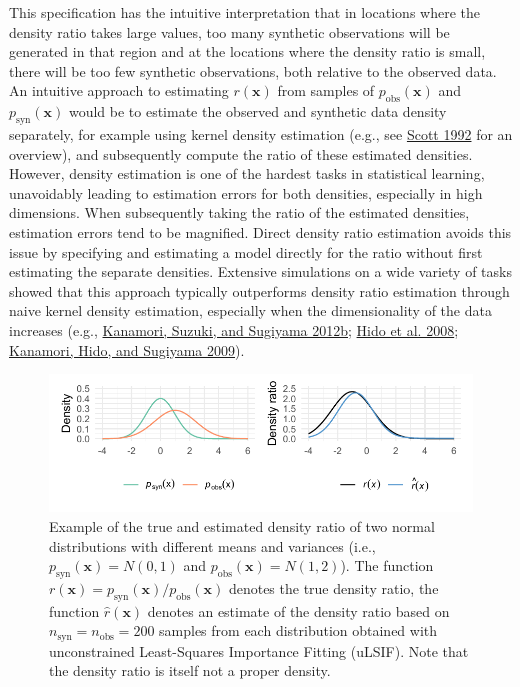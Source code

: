 \documentclass[
]{article}
\newcommand{\pobs}{p_{\text{obs}}}
\newcommand{\psyn}{p_{\text{syn}}}
\newcommand{\nobs}{n_{\text{obs}}}
\newcommand{\nsyn}{n_{\text{syn}}}
\newcommand{\bx}{\mathbf{x}}
\begin{document}
This specification has the intuitive interpretation that in locations
where the density ratio takes large values, too many synthetic
observations will be generated in that region and at the locations where
the density ratio is small, there will be too few synthetic
observations, both relative to the observed data. An intuitive approach
to estimating \(r(\bx)\) from samples of \(\pobs(\bx)\) and
\(\psyn(\bx)\) would be to estimate the observed and synthetic data
density separately, for example using kernel density estimation (e.g.,
see \protect\hyperlink{ref-Scott1992}{Scott 1992} for an overview), and
subsequently compute the ratio of these estimated densities. However,
density estimation is one of the hardest tasks in statistical learning,
unavoidably leading to estimation errors for both densities, especially
in high dimensions. When subsequently taking the ratio of the estimated
densities, estimation errors tend to be magnified. Direct density ratio
estimation avoids this issue by specifying and estimating a model
directly for the ratio without first estimating the separate densities.
Extensive simulations on a wide variety of tasks showed that this
approach typically outperforms density ratio estimation through naive
kernel density estimation, especially when the dimensionality of the
data increases (e.g., \protect\hyperlink{ref-Kanamori2012}{Kanamori,
Suzuki, and Sugiyama 2012b};
\protect\hyperlink{ref-shohei_dre_outlier_2008}{Hido et al. 2008};
\protect\hyperlink{ref-kanamori_ulsif_2009}{Kanamori, Hido, and Sugiyama
2009}).

\begin{figure}[t]

{\centering \includegraphics[width=1\textwidth,height=\textheight]{paper_files/figure-pdf/fig-dr-plot-1.pdf}

}

\caption{\label{fig-dr-plot}Example of the true and estimated density
ratio of two normal distributions with different means and variances
(i.e., \(\psyn(\bx) = N(0,1)\) and \(\pobs(\bx) = N(1,2)\)). The
function \(r(\bx) = \psyn(\bx)/\pobs(\bx)\) denotes the true density
ratio, the function \(\hat{r}(\bx)\) denotes an estimate of the density
ratio based on \(\nsyn = \nobs = 200\) samples from each distribution
obtained with unconstrained Least-Squares Importance Fitting (uLSIF).
Note that the density ratio is itself not a proper density.}

\end{figure}
\end{document}

